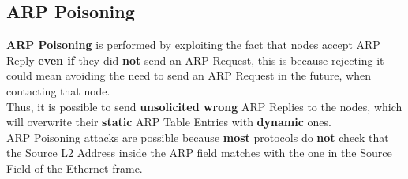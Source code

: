\subsection{ARP Poisoning}
\textbf{ARP Poisoning} is performed by exploiting the fact that nodes accept ARP Reply \textbf{even if}
they did \textbf{not} send an ARP Request, this is because rejecting it could mean avoiding the need
to send an ARP Request in the future, when contacting that node.\\ 
Thus, it is possible to send \textbf{unsolicited wrong} ARP Replies to the nodes, which will overwrite
their \textbf{static} ARP Table Entries with \textbf{dynamic} ones.\\
ARP Poisoning attacks are possible because \textbf{most} protocols do \textbf{not} check that the Source L2 Address inside the ARP field matches with the one in the Source Field of the Ethernet frame.

